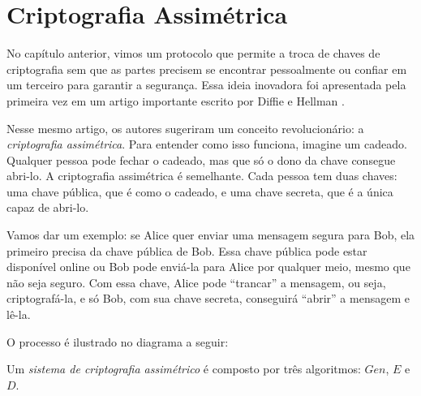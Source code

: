\chapter{Criptografia Assimétrica}
\label{cha:criptografia-assimetrica}

No capítulo anterior, vimos um protocolo que permite a troca de chaves de criptografia sem que as partes precisem se encontrar pessoalmente ou confiar em um terceiro para garantir a segurança.
Essa ideia inovadora foi apresentada pela primeira vez em um artigo importante escrito por Diffie e Hellman \cite{Diffie76}.

Nesse mesmo artigo, os autores sugeriram um conceito revolucionário: a {\em criptografia assimétrica}.
Para entender como isso funciona, imagine um cadeado.
Qualquer pessoa pode fechar o cadeado, mas que só o dono da chave consegue abri-lo.
A criptografia assimétrica é semelhante.
Cada pessoa tem duas chaves: uma chave pública, que é como o cadeado, e uma chave secreta, que é a única capaz de abri-lo.

Vamos dar um exemplo: se Alice quer enviar uma mensagem segura para Bob, ela primeiro precisa da chave pública de Bob.
Essa chave pública pode estar disponível online ou Bob pode enviá-la para Alice por qualquer meio, mesmo que não seja seguro.
Com essa chave, Alice pode ``trancar'' a mensagem, ou seja, criptografá-la, e só Bob, com sua chave secreta, conseguirá ``abrir'' a mensagem e lê-la.

O processo é ilustrado no diagrama a seguir:


\begin{center}
\end{center}

Um \textit{sistema de criptografia assimétrico} é composto por três algoritmos: $Gen$, $E$ e $D$.


